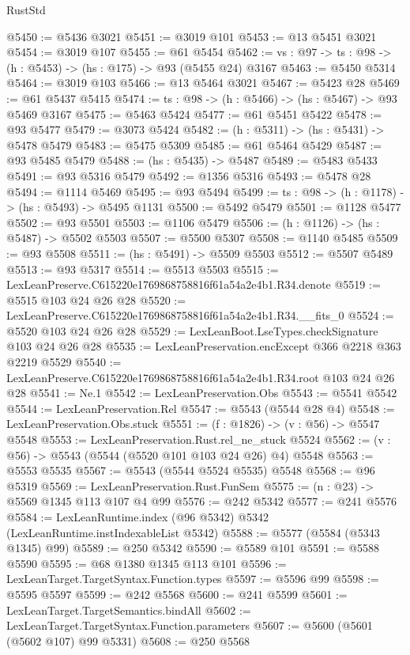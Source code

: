 \begin{lexlean}{RustStd}
\begin{coremodule}
@5450 := @5436 @3021
@5451 := @3019 @101
@5453 := @13 @5451 @3021
@5454 := @3019 @107
@5455 := @61 @5454
@5462 := {vs : @97} -> {ts : @98} -> (h : @5453) -> (hs : @175) -> @93 (@5455 @24) @3167
@5463 := @5450 @5314
@5464 := @3019 @103
@5466 := @13 @5464 @3021
@5467 := @5423 @28
@5469 := @61 @5437 @5415
@5474 := {ts : @98} -> (h : @5466) -> (hs : @5467) -> @93 @5469 @3167
@5475 := @5463 @5424
@5477 := @61 @5451 @5422
@5478 := @93 @5477
@5479 := @3073 @5424
@5482 := (h : @5311) -> (hs : @5431) -> @5478 @5479
@5483 := @5475 @5309
@5485 := @61 @5464 @5429
@5487 := @93 @5485 @5479
@5488 := (hs : @5435) -> @5487
@5489 := @5483 @5433
@5491 := @93 @5316 @5479
@5492 := @1356 @5316
@5493 := @5478 @28
@5494 := @1114 @5469
@5495 := @93 @5494
@5499 := {ts : @98} -> (h : @1178) -> (hs : @5493) -> @5495 @1131
@5500 := @5492 @5479
@5501 := @1128 @5477
@5502 := @93 @5501
@5503 := @1106 @5479
@5506 := (h : @1126) -> (hs : @5487) -> @5502 @5503
@5507 := @5500 @5307
@5508 := @1140 @5485
@5509 := @93 @5508
@5511 := (hs : @5491) -> @5509 @5503
@5512 := @5507 @5489
@5513 := @93 @5317
@5514 := @5513 @5503
@5515 := LexLeanPreserve.C615220e1769868758816f61a54a2e4b1.R34.denote
@5519 := @5515 @103 @24 @26 @28
@5520 := LexLeanPreserve.C615220e1769868758816f61a54a2e4b1.R34.__fits_0
@5524 := @5520 @103 @24 @26 @28
@5529 := LexLeanBoot.LseTypes.checkSignature @103 @24 @26 @28
@5535 := LexLeanPreservation.encExcept @366 @2218 @363 @2219 @5529
@5540 := LexLeanPreserve.C615220e1769868758816f61a54a2e4b1.R34.root @103 @24 @26 @28
@5541 := Ne.{1}
@5542 := LexLeanPreservation.Obs
@5543 := @5541 @5542
@5544 := LexLeanPreservation.Rel
@5547 := @5543 (@5544 @28 @4)
@5548 := LexLeanPreservation.Obs.stuck
@5551 := (f : @1826) -> (v : @56) -> @5547 @5548
@5553 := LexLeanPreservation.Rust.rel_ne_stuck @5524
@5562 := (v : @56) -> @5543 (@5544 (@5520 @101 @103 @24 @26) @4) @5548
@5563 := @5553 @5535
@5567 := @5543 (@5544 @5524 @5535) @5548
@5568 := @96 @5319
@5569 := LexLeanPreservation.Rust.FunSem
@5575 := (n : @23) -> @5569 @1345 @113 @107 @4 @99
@5576 := @242 @5342
@5577 := @241 @5576
@5584 := LexLeanRuntime.index (@96 @5342) @5342 (LexLeanRuntime.instIndexableList @5342)
@5588 := @5577 (@5584 (@5343 @1345) @99)
@5589 := @250 @5342
@5590 := @5589 @101
@5591 := @5588 @5590
@5595 := @68 @1380 @1345 @113 @101
@5596 := LexLeanTarget.TargetSyntax.Function.types
@5597 := @5596 @99
@5598 := @5595 @5597
@5599 := @242 @5568
@5600 := @241 @5599
@5601 := LexLeanTarget.TargetSemantics.bindAll
@5602 := LexLeanTarget.TargetSyntax.Function.parameters
@5607 := @5600 (@5601 (@5602 @107) @99 @5331)
@5608 := @250 @5568

\end{coremodule}
\end{lexlean}
